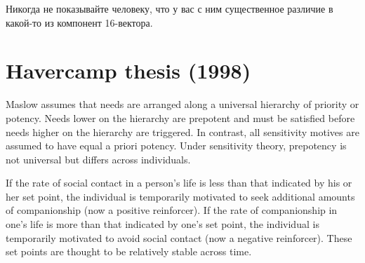 \documentclass[11pt]{article}
\theoremstyle{remark}
\theoremstyle{definition}
\begin{document}
Никогда не показывайте человеку, что у вас с ним существенное различие в какой-то из компонент 16-вектора.





\section{Havercamp thesis (1998)}







Maslow assumes that needs are arranged along a universal hierarchy of priority or potency. Needs lower on the hierarchy are prepotent and must be satisfied before needs higher on the hierarchy are triggered. In contrast, all sensitivity motives are assumed to have equal a priori potency. Under sensitivity theory, prepotency is not universal but differs across individuals.

If the rate of social contact in a person’s life is less than that indicated by his or her set point, the individual is temporarily motivated to seek additional amounts of companionship (now a positive reinforcer). If the rate of companionship in one’s life is more than that indicated by one’s set point, the individual is temporarily motivated to avoid social contact (now a negative reinforcer). These set points are thought to be relatively stable across time.
\end{document}
